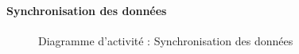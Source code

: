 \newpage
\paragraph{Synchronisation des données}
\begin{bigcenter}
    \begin{figure}[h]
        \centering
        \scalebox{0.64}{}
        \caption{Diagramme d'activité : Synchronisation des données}
        \label{SyncSynchronisation}
    \end{figure}
\end{bigcenter}



